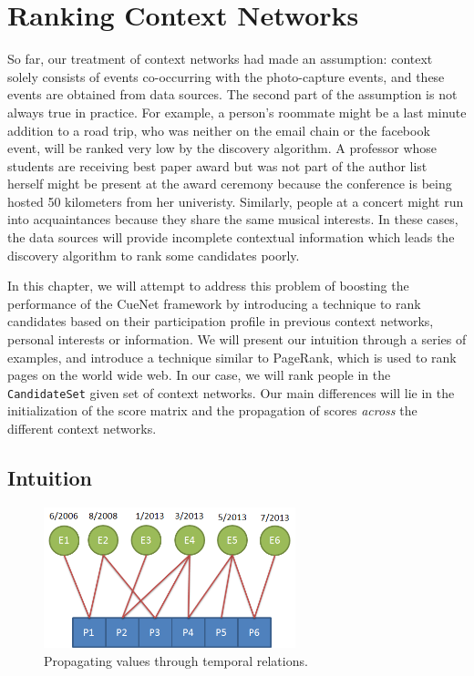 \chapter{Ranking Context Networks}

So far, our treatment of context networks had made an assumption: context solely consists of events co-occurring with the photo-capture events, and these events are obtained from data sources. The second part of the assumption is not always true in practice. For example, a person's roommate might be a last minute addition to a road trip, who was neither on the email chain or the facebook event, will be ranked very low by the discovery algorithm. A professor whose students are receiving best paper award but was not part of the author list herself might be present at the award ceremony because the conference is being hosted 50 kilometers from her univeristy. Similarly, people at a concert might run into acquaintances because they share the same musical interests. In these cases, the data sources will provide incomplete contextual information which leads the discovery algorithm to rank some candidates poorly.

In this chapter, we will attempt to address this problem of boosting the performance of the CueNet framework by introducing a technique to rank candidates based on their participation profile in previous context networks, personal interests or information. We will present our intuition through a series of examples, and introduce a technique similar to PageRank, which is used to rank pages on the world wide web. In our case, we will rank people in the \texttt{CandidateSet} given set of context networks. Our main differences will lie in the initialization of the score matrix and the propagation of scores \textit{across} the different context networks.

\section{Intuition}

\begin{figure}[t]
\centering
\includegraphics[width=0.65\textwidth]{media/chapter6/intuition-time-example.png}
\caption{Propagating values through temporal relations.}
\label{fig:time-example}
\end{figure}

